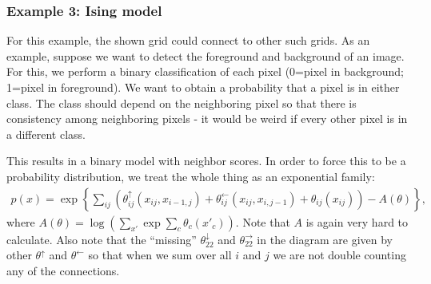 \documentclass{article}
\begin{document}
\subsubsection{Example 3: Ising model}

\begin{center}
\end{center}
\smallskip
For this example, the shown grid could connect to other such grids. As an example, suppose we want to detect the foreground and background of an image. For this, we perform a binary classification of each pixel (0=pixel in background; 1=pixel in foreground). We want to obtain a probability that a pixel is in either class. The class should depend on the neighboring pixel so that there is consistency among neighboring pixels - it would be weird if every other pixel is in a different class.

This results in a binary model with neighbor scores. In order to force this to be a probability distribution, we treat the whole thing as an exponential family:
\begin{align}
p(x) = \exp\left\{ \sum_{ij} \left( \theta_{ij}^{\uparrow} (x_{ij}, x_{i-1,j} ) + \theta_{ij}^{\leftarrow} (x_{ij}, x_{i,j-1} ) + \theta_{ij}(x_{ij})\right) - A(\theta)\right\},
\end{align}
where $A(\theta) =  \log\left(\sum_{x'} \exp\sum_c \theta_c(x'_c)\right)$. Note that $A$ is again very hard to calculate. Also note that the ``missing'' $\theta_{22}^{\downarrow}$ and $\theta_{22}^{\rightarrow}$ in the diagram are given by other $\theta^{\uparrow}$ and $\theta^{\leftarrow}$ so that when we sum over all $i$ and $j$ we are not double counting any of the connections. 
\end{document}
